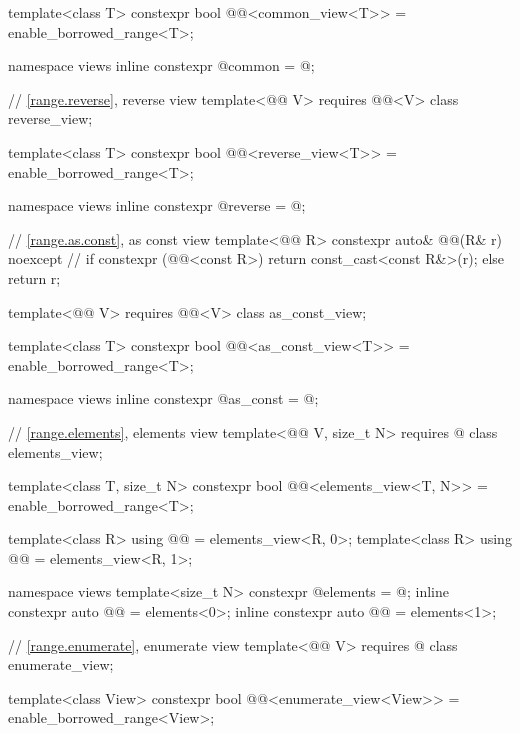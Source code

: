 \begin{codeblock}
{  template<class T>
    constexpr bool @@<common_view<T>> =
      enable_borrowed_range<T>;

  namespace views { inline constexpr @\unspecnc@ common = @\unspecnc@; }

  // \ref{range.reverse}, reverse view
  template<@@ V>
    requires @@<V>
  class reverse_view;

  template<class T>
    constexpr bool @@<reverse_view<T>> =
      enable_borrowed_range<T>;

  namespace views { inline constexpr @\unspecnc@ reverse = @\unspecnc@; }

  // \ref{range.as.const}, as const view
  template<@@ R>
    constexpr auto& @@(R& r) noexcept { // \expos
      if constexpr (@@<const R>) {
        return const_cast<const R&>(r);
      } else {
        return r;
      }
    }

  template<@@ V>
    requires @@<V>
  class as_const_view;

  template<class T>
    constexpr bool @@<as_const_view<T>> =
      enable_borrowed_range<T>;

  namespace views { inline constexpr @\unspecnc@ as_const = @\unspecnc@; }

  // \ref{range.elements}, elements view
  template<@@ V, size_t N>
    requires @\seebelow@
  class elements_view;

  template<class T, size_t N>
    constexpr bool @@<elements_view<T, N>> =
      enable_borrowed_range<T>;

  template<class R>
    using @@ = elements_view<R, 0>;
  template<class R>
    using @@ = elements_view<R, 1>;

  namespace views {
    template<size_t N>
      constexpr @\unspecnc@ elements = @\unspecnc@;
    inline constexpr auto @@ = elements<0>;
    inline constexpr auto @@ = elements<1>;
  }

  // \ref{range.enumerate}, enumerate view
  template<@@ V>
    requires @\seebelow@
  class enumerate_view;

  template<class View>
    constexpr bool @@<enumerate_view<View>> =
      enable_borrowed_range<View>;

}
\end{codeblock}
